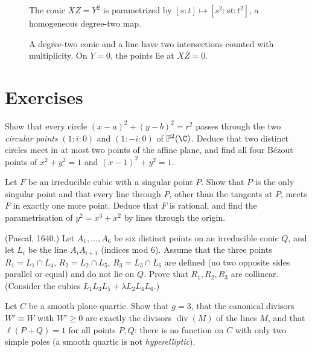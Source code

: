 \begin{figure}[ht]
\centering
{}
\caption{The conic $XZ=Y^2$ is parametrized by $[s:t]\mapsto[s^2:st:t^2]$, a homogeneous degree-two map.}
\label{fig:v13-extra-14-a}
\end{figure}

\begin{figure}[ht]
\centering
{}
\caption{A degree-two conic and a line have two intersections counted with multiplicity. On $Y=0$, the points lie at $XZ=0$.}
\label{fig:v13-extra-14-b}
\end{figure}

\section{Exercises}

\begin{exercise}[$\star$]\label{ex:circles}
Show that every circle $(x-a)^2+(y-b)^2=r^2$ passes through the two \emph{circular points} $(1:i:0)$ and $(1:-i:0)$ of $\mathbb P^2(\C)$. Deduce that two
distinct circles meet in at most two points of the affine plane, and find all four B\'ezout points of $x^2+y^2=1$ and $(x-1)^2+y^2=1$.
\end{exercise}

\begin{exercise}[$\star$]\label{ex:singcubic}
Let $F$ be an irreducible cubic with a singular point $P$. Show that $P$ is the only singular point and that every line through $P$, other than the
tangents at $P$, meets $F$ in exactly one more point. Deduce that $F$ is rational, and find the parametrisation of $y^2=x^3+x^2$ by lines through the
origin.
\end{exercise}

\begin{exercise}[$\star$]\label{ex:pascal}
(Pascal, 1640.) Let $A_1,\dots,A_6$ be six distinct points on an irreducible conic $Q$, and let $L_i$ be the line $A_iA_{i+1}$ (indices mod $6$). Assume
that the three points $R_1=L_1\cap L_4$, $R_2=L_2\cap L_5$, $R_3=L_3\cap L_6$ are defined (no two opposite sides parallel or equal) and do not lie on $Q$.
Prove that $R_1,R_2,R_3$ are collinear. (Consider the cubics $L_1L_3L_5+\lambda L_2L_4L_6$.)
\end{exercise}

\begin{exercise}[$\star\star$]\label{ex:quartic}
Let $C$ be a smooth plane quartic. Show that $g=3$, that the canonical divisors $W'\equiv W$ with $W'\ge0$ are exactly the divisors $\operatorname{div}(M)$ of the
lines $M$, and that $\ell(P+Q)=1$ for all points $P,Q$: there is no function on $C$ with only two simple poles (a smooth quartic is not
\emph{hyperelliptic}).
\end{exercise}

